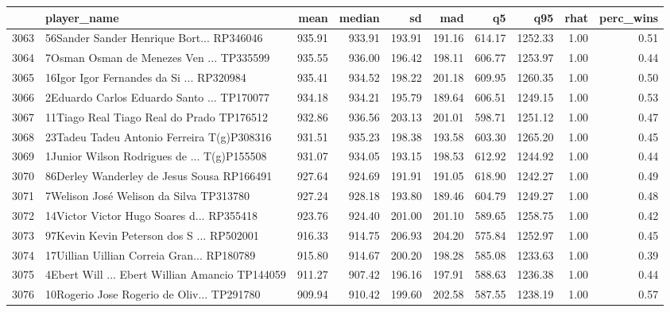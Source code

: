 \begin{table}[ht]
\centering
\begin{tabular}{rlrrrrrrrr}
  \hline
 & player\_name & mean & median & sd & mad & q5 & q95 & rhat & perc\_wins \\ 
  \hline
3063 & 56Sander Sander Henrique Bort... RP346046 & 935.91 & 933.91 & 193.91 & 191.16 & 614.17 & 1252.33 & 1.00 & 0.51 \\ 
  3064 & 7Osman Osman de Menezes Ven ... TP335599 & 935.55 & 936.00 & 196.42 & 198.11 & 606.77 & 1253.97 & 1.00 & 0.44 \\ 
  3065 & 16Igor Igor Fernandes da Si ... RP320984 & 935.41 & 934.52 & 198.22 & 201.18 & 609.95 & 1260.35 & 1.00 & 0.50 \\ 
  3066 & 2Eduardo Carlos Eduardo Santo ... TP170077 & 934.18 & 934.21 & 195.79 & 189.64 & 606.51 & 1249.15 & 1.00 & 0.53 \\ 
  3067 & 11Tiago Real Tiago Real do Prado TP176512 & 932.86 & 936.56 & 203.13 & 201.01 & 598.71 & 1251.12 & 1.00 & 0.47 \\ 
  3068 & 23Tadeu Tadeu Antonio Ferreira T(g)P308316 & 931.51 & 935.23 & 198.38 & 193.58 & 603.30 & 1265.20 & 1.00 & 0.45 \\ 
  3069 & 1Junior Wilson Rodrigues de  ... T(g)P155508 & 931.07 & 934.05 & 193.15 & 198.53 & 612.92 & 1244.92 & 1.00 & 0.44 \\ 
  3070 & 86Derley Wanderley de Jesus Sousa RP166491 & 927.64 & 924.69 & 191.91 & 191.05 & 618.90 & 1242.27 & 1.00 & 0.49 \\ 
  3071 & 7Welison José Welison da Silva TP313780 & 927.24 & 928.18 & 193.80 & 189.46 & 604.79 & 1249.27 & 1.00 & 0.48 \\ 
  3072 & 14Victor Victor Hugo Soares d... RP355418 & 923.76 & 924.40 & 201.00 & 201.10 & 589.65 & 1258.75 & 1.00 & 0.42 \\ 
  3073 & 97Kevin Kevin Peterson dos S ... RP502001 & 916.33 & 914.75 & 206.93 & 204.20 & 575.84 & 1252.97 & 1.00 & 0.45 \\ 
  3074 & 17Uillian Uillian Correia Gran... RP180789 & 915.80 & 914.67 & 200.20 & 198.28 & 585.08 & 1233.63 & 1.00 & 0.39 \\ 
  3075 & 4Ebert Will ... Ebert Willian Amancio TP144059 & 911.27 & 907.42 & 196.16 & 197.91 & 588.63 & 1236.38 & 1.00 & 0.44 \\ 
  3076 & 10Rogerio Jose Rogerio de Oliv... TP291780 & 909.94 & 910.42 & 199.60 & 202.58 & 587.55 & 1238.19 & 1.00 & 0.57 \\ 

\end{tabular}
\end{table}
